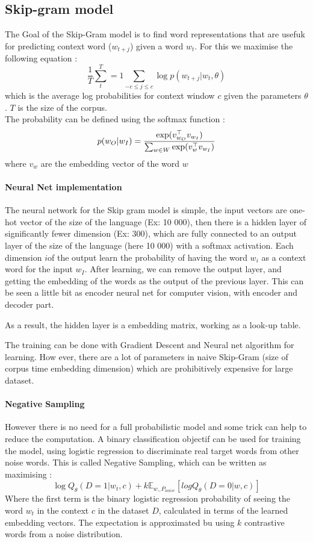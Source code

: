 		\subsection*{Skip-gram model}

			The Goal of the Skip-Gram model is to find word representations that are usefuk for predicting context word ($w_{t+j}$) given a word $w_t$. For this we maximise the following equation : 
			\[
				\frac{1}{T}\sum^T_t=1 \sum_{-c\leq j\leq c}\log p(w_{t+j} | w_t, \theta)
			\]
			which is the average log probabilities for context window $c$ given the parameters $\theta$. $T$ is the size of the corpus.\\
			The probability can be defined using the softmax function : 
			\[
				p(w_O |  w_I) = \frac{\exp(v_{w_O}^\top v_{w_I})}{\sum_{w\in W}\exp(v_{w}^\top v_{w_I})}
			\]
			where $v_w$ are the embedding vector of the word $w$

			\paragraph*{Neural Net implementation}

			The neural network for the Skip gram model is simple, the input vectors are one-hot vector of the size of the language (Ex: 10 000), then there is a hidden layer of significantly fewer dimension (Ex: 300), which are fully connected to an output layer of the size of the language (here 10 000) with a softmax activation. Each dimension $i$of the output learn the probability of having the word $w_i$ as a context word for the input $w_I$. After learning, we can remove the output layer, and getting the embedding of the words as the output of the previous layer. This can be seen a little bit as encoder neural net for computer vision, with encoder and decoder part. 

			As a result, the hidden layer is a embedding matrix, working as a look-up table. 

			The training can be done with Gradient Descent and Neural net algorithm for learning. How ever, there are a lot of parameters in naive Skip-Gram (size of corpus time embedding dimension) which are prohibitively expensive for large dataset.

			\paragraph*{Negative Sampling}
				However there is no need for a full probabilistic model and some trick can help to reduce the computation. A binary classification objectif can be used for training the model, using logistic regression to discriminate real target words from other noise words. This is called Negative Sampling, which can be written as maximising : 
				\[
					\log Q_\theta (D=1| w_t, c) + k \mathbb{E}_{w_\sim P_{noise}}[log Q_\theta(D=0 | w, c)]
				\]
				Where the first term is the binary logistic regression probability of seeing the word $w_t$ in the context $c$ in the dataset $D$, calculated in terms of the learned embedding vectors. The expectation is approximated bu using $k$ contrastive words from a noise distribution.

